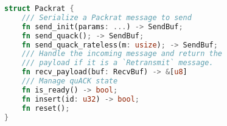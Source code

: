 \begin{lstfloat}[t]
\begin{lstlisting}[language=Rust]
struct Packrat {
    /// Serialize a Packrat message to send
    fn send_init(params: ...) -> SendBuf;
    fn send_quack(); -> SendBuf;
    fn send_quack_rateless(m: usize); -> SendBuf;
    /// Handle the incoming message and return the
    /// payload if it is a `Retransmit` message.
    fn recv_payload(buf: RecvBuf) -> &[u8]
    /// Manage quACK state
    fn is_ready() -> bool;
    fn insert(id: u32) -> bool;
    fn reset();
}
\end{lstlisting}
\label{lst:quacker-interface}
\end{lstfloat}